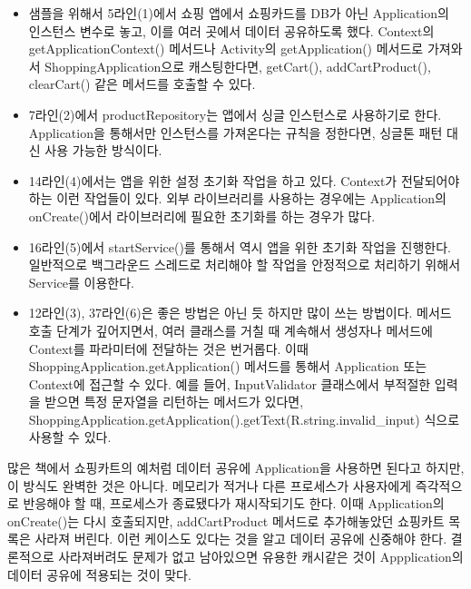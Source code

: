 \begin{itemize}
\item 샘플을 위해서 5라인(1)에서 쇼핑 앱에서 쇼핑카드를 DB가 아닌 Application의 인스턴스 변수로 놓고, 이를 여러 곳에서 데이터 공유하도록 했다.
Context의 getApplicationContext() 메서드나 Activity의 getApplication() 메서드로 가져와서 ShoppingApplication으로 캐스팅한다면, getCart(), addCartProduct(), clearCart() 같은 메서드를 호출할 수 있다.

\item 7라인(2)에서 productRepository는 앱에서 싱글 인스턴스로 사용하기로 한다. Application을 통해서만 인스턴스를 가져온다는 규칙을 정한다면, 싱글톤 패턴 대신 사용 가능한 방식이다.  

\item 14라인(4)에서는 앱을 위한 설정 초기화 작업을 하고 있다. Context가 전달되어야 하는 이런 작업들이 있다. 외부 라이브러리를 사용하는 경우에는 Application의 onCreate()에서 라이브러리에 필요한 초기화를 하는 경우가 많다.

\item 16라인(5)에서 startService()를 통해서 역시 앱을 위한 초기화 작업을 진행한다. 일반적으로 백그라운드 스레드로 처리해야 할 작업을 안정적으로 처리하기 위해서 Service를 이용한다.

\item 12라인(3), 37라인(6)은 좋은 방법은 아닌 듯 하지만 많이 쓰는 방법이다. 
메서드 호출 단계가 깊어지면서, 여러 클래스를 거칠 때 계속해서 생성자나 메서드에 Context를 파라미터에 전달하는 것은 번거롭다. 
이때 ShoppingApplication.getApplication() 메서드를 통해서 Application 또는 Context에 접근할 수 있다.
예를 들어, InputValidator 클래스에서 부적절한 입력을 받으면 특정 문자열을 리턴하는 메서드가 있다면,  ShoppingApplication.getApplication().getText(R.string.invalid\_input) 식으로 사용할 수 있다.
\end{itemize}

많은 책에서 쇼핑카트의 예처럼 데이터 공유에 Application을 사용하면 된다고 하지만, 이 방식도 완벽한 것은 아니다.
메모리가 적거나 다른 프로세스가 사용자에게 즉각적으로 반응해야 할 때, 프로세스가 종료됐다가 재시작되기도 한다.
이때 Application의 onCreate()는 다시 호출되지만, addCartProduct 메서드로 추가해놓았던 쇼핑카트 목록은 사라져 버린다. 이런 케이스도 있다는 것을 알고 데이터 공유에 신중해야 한다.
결론적으로 사라져버려도 문제가 없고 남아있으면 유용한 캐시같은 것이 Appplication의 데이터 공유에 적용되는 것이 맞다.

